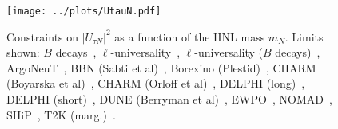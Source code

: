 \documentclass{revtex4-2}%
\begin{document}
%


\begin{figure}[h!]%
\centering%
\texttt{[image: ../plots/UtauN.pdf]}%
\caption{Constraints on $|U_{\tau N}|^2$ as a function of the HNL mass $m_N$. Limits shown: $B$ decays~\cite{Cvetic:2017gkt}, $\ell$-universality~\cite{Fernandez-Martinez:2016lgt}, $\ell$-universality ($B$ decays)~\cite{Cvetic:2017gkt}, ArgoNeuT~\cite{ArgoNeuT:2021clc}, BBN (Sabti et al)~\cite{Sabti:2020yrt}, Borexino (Plestid)~\cite{Plestid:2020ssy}, CHARM (Boyarska et al)~\cite{Boiarska:2021yho}, CHARM (Orloff et al)~\cite{Orloff:2002de}, DELPHI (long)~\cite{DELPHI:1996qcc}, DELPHI (short)~\cite{DELPHI:1996qcc}, DUNE (Berryman et al)~\cite{Berryman:2019dme}, EWPO~\cite{Bolton:2019pcu}, NOMAD~\cite{NOMAD:2001eyx}, SHiP~\cite{SHiP:2018xqw}, T2K (marg.)~\cite{T2K:2019jwa}.}%
\end{figure}

%
%
%
\end{document}
